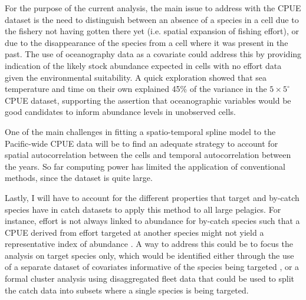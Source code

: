 \documentclass{article}
\newcommand{\griddef}[2]{$#1 \times #2^\circ$}
\begin{document}

For the purpose of the current analysis, the main issue to address
with the CPUE dataset is the need to distinguish between an absence of
a species in a cell due to the fishery not having gotten there yet
(i.e. spatial expansion of fishing effort), or
due to the disappearance of the species from a cell where it was
present in the past. The use of oceanography data as a covariate could
address this by providing indication of the likely stock abundance
expected in cells with no effort data given the environmental
suitability. A quick exploration showed that sea temperature and time on
their own explained 45\% of the variance in the \griddef{5}{5} CPUE dataset,
supporting the assertion that oceanographic variables would be good
candidates to inform abundance levels in unobserved cells.

One of the main challenges in fitting a spatio-temporal spline model
to the Pacific-wide CPUE data will be to find an adequate strategy to
account for spatial autocorrelation between the cells and
temporal autocorrelation between the years. So far computing power has
limited the application of conventional methods, since the dataset is
quite large.


Lastly, I will have to account for the different properties that target
and by-catch species have in catch datasets to apply this method to
all large pelagics. For instance, effort is not always linked to
abundance for by-catch species such that a CPUE derived from effort
targeted at another species might not yield a
representative index of abundance \citep[see][]{Ortiz2004_a}. A way to address this could be to focus the
analysis on target species only, which would be identified either
through the use of a separate dataset of covariates informative of the
species being targeted \citep[e.g. historical expert opinion,
hooks-per-basket, see][]{Ward2005_a}, or a formal cluster analysis
using disaggregated fleet data that could be used to split the catch
data into subsets where a single species is being targeted.
\end{document}

